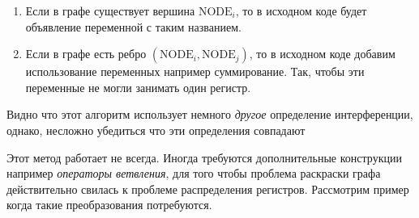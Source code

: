 \documentclass[12pt]{article}
\begin{document}
\begin{enumerate}
    \item Если в графе существует вершина $\text{NODE}_i$, то в исходном коде будет объявление переменной с таким
    названием.
    \item Если в графе есть ребро $(\text{NODE}_i, \text{NODE}_j)$, то в исходном коде добавим использование переменных
    например суммирование. Так, чтобы эти переменные не могли занимать один регистр.
\end{enumerate}

Видно что этот алгоритм использует немного \textit{другое} определение интерференции, однако, несложно убедиться что эти определения
совпадают

Этот метод работает не всегда. Иногда требуются дополнительные конструкции например \textit{операторы ветвления},
для того чтобы проблема раскраски графа действительно свилась к проблеме распределения регистров. Рассмотрим пример когда такие
преобразования потребуются.
\end{document}
